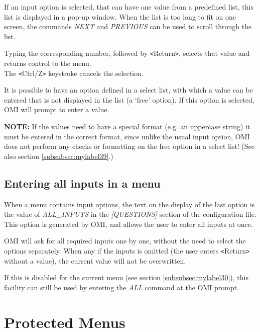 \documentclass[a4paper]{book}
\newcommand{\vs}{\vspace{3mm}}
\newcommand{\lt}{\texttt{<}}
\newcommand{\gt}{\texttt{>}}
\begin{document}
If an input option is selected, that can have one value from a predefined 
list, this list is displayed in a pop-up window. When the list is too long 
to fit on one screen, the commands \textsl{NEXT} and \textsl{PREVIOUS} can be used to scroll 
through the list.

Typing the corresponding number, followed by \lt Return\gt , selects that value 
and returns control to the menu. \\
The \lt Ctrl/Z\gt{} keystroke cancels the selection.

\vs

It is possible to have an option defined in a select list, with which a 
value can be entered that is not displayed in the list (a `free' option). If 
this option is selected, OMI will prompt to enter a value.

\vs 

\hspace{-8mm}\textbf{NOTE:} If the values need to have a special format (e.g. an 
uppercase string) it must be entered in the correct format, since unlike the 
usual input option, OMI does not perform any checks or formatting on the 
free option in a select list! (See also section \ref{subsubsec:mylabel39}.)

\subsection{Entering all inputs in a menu}
\label{subsubsec:entering}

When a menu contains input options, the text on the display of the last 
option is the value of \textsl{ALL{\_}INPUTS}  in the 
\textsl{[QUESTIONS]} section of the configuration file. This option is generated by 
OMI, and allows the user to enter all inputs at once.

\vs

OMI will ask for all required inputs one by one, without the need to select 
the options separately. When any if the inputs is omitted (the user enters 
\lt Return\gt{} without a value), the current value will not be overwritten.

If this is disabled for the current menu (see section \ref{subsubsec:mylabel30}),
this facility can still be used by entering the \textsl{ALL} command at the OMI prompt.

\section{Protected Menus}
\label{subsec:protected}
\end{document}
